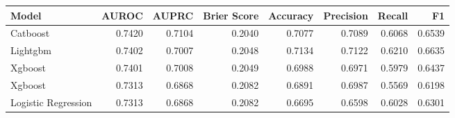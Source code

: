 \begin{tabular}{lrrrrrrr}
\toprule
Model & AUROC & AUPRC & Brier Score & Accuracy & Precision & Recall & F1 \\
\midrule
Catboost & 0.7420 & 0.7104 & 0.2040 & 0.7077 & 0.7089 & 0.6068 & 0.6539 \\
Lightgbm & 0.7402 & 0.7007 & 0.2048 & 0.7134 & 0.7122 & 0.6210 & 0.6635 \\
Xgboost & 0.7401 & 0.7008 & 0.2049 & 0.6988 & 0.6971 & 0.5979 & 0.6437 \\
Xgboost & 0.7313 & 0.6868 & 0.2082 & 0.6891 & 0.6987 & 0.5569 & 0.6198 \\
Logistic Regression & 0.7313 & 0.6868 & 0.2082 & 0.6695 & 0.6598 & 0.6028 & 0.6301 \\
\bottomrule
\end{tabular}
